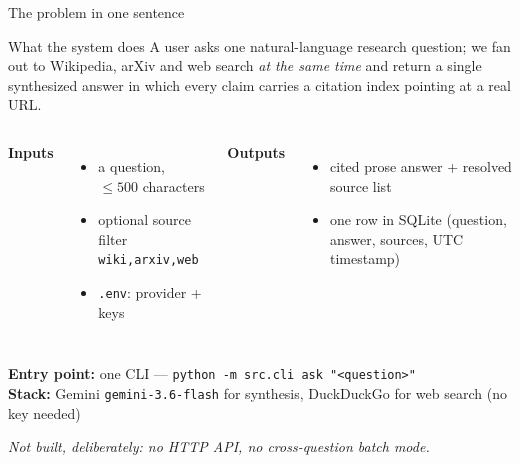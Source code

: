 \documentclass[aspectratio=169,11pt]{beamer}
\begin{document}
\begin{frame}{The problem in one sentence}
  \begin{block}{What the system does}
    A user asks one natural-language research question; we fan out to Wikipedia, arXiv and web
    search \emph{at the same time} and return a single synthesized answer in which every claim
    carries a citation index pointing at a real URL.
  \end{block}

  \vspace{0.2em}
  \begin{columns}[T,onlytextwidth]
  \textbf{Inputs}
  \begin{itemize}\setlength\itemsep{0.15em}
    \item a question, $\le 500$ characters
    \item optional source filter \texttt{wiki,arxiv,web}
    \item \texttt{.env}: provider + keys
  \end{itemize}

  \textbf{Outputs}
  \begin{itemize}\setlength\itemsep{0.15em}
    \item cited prose answer + resolved source list
    \item one row in SQLite (question, answer, sources, UTC timestamp)
  \end{itemize}
  \end{columns}

  \vspace{0.5em}
  \textbf{Entry point:} one CLI --- \texttt{python -m src.cli ask "<question>"}\\
  \textbf{Stack:} Gemini \texttt{gemini-3.6-flash} for synthesis, DuckDuckGo for web search
  (no key needed)

  \vspace{0.3em}
  {\footnotesize\textit{Not built, deliberately: no HTTP API, no cross-question batch mode.}}
\end{frame}
\end{document}
